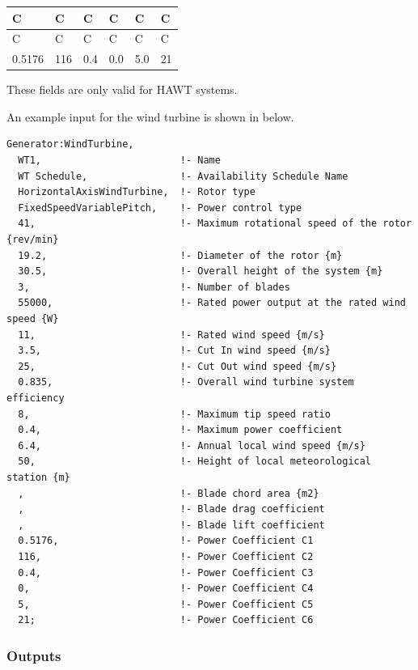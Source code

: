 \begin{longtable}[c]{@{}llllll@{}}
\toprule
C & C & C & C & C & C \tabularnewline
\midrule
\endfirsthead

\toprule
C & C & C & C & C & C \tabularnewline
\midrule
\endhead

0.5176 & 116 & 0.4 & 0.0 & 5.0 & 21 \tabularnewline
\bottomrule
\end{longtable}

These fields are only valid for HAWT systems.

An example input for the wind turbine is shown in below.

\begin{lstlisting}
Generator:WindTurbine,
  WT1,                        !- Name
  WT Schedule,                !- Availability Schedule Name
  HorizontalAxisWindTurbine,  !- Rotor type
  FixedSpeedVariablePitch,    !- Power control type
  41,                         !- Maximum rotational speed of the rotor {rev/min}
  19.2,                       !- Diameter of the rotor {m}
  30.5,                       !- Overall height of the system {m}
  3,                          !- Number of blades
  55000,                      !- Rated power output at the rated wind speed {W}
  11,                         !- Rated wind speed {m/s}
  3.5,                        !- Cut In wind speed {m/s}
  25,                         !- Cut Out wind speed {m/s}
  0.835,                      !- Overall wind turbine system efficiency
  8,                          !- Maximum tip speed ratio
  0.4,                        !- Maximum power coefficient
  6.4,                        !- Annual local wind speed {m/s}
  50,                         !- Height of local meteorological station {m}
  ,                           !- Blade chord area {m2}
  ,                           !- Blade drag coefficient
  ,                           !- Blade lift coefficient
  0.5176,                     !- Power Coefficient C1
  116,                        !- Power Coefficient C2
  0.4,                        !- Power Coefficient C3
  0,                          !- Power Coefficient C4
  5,                          !- Power Coefficient C5
  21;                         !- Power Coefficient C6
\end{lstlisting}

\subsubsection{Outputs}\label{outputs-12-001}


